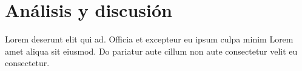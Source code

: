 \section{Análisis y discusión}
Lorem deserunt elit qui ad. Officia et excepteur eu ipsum culpa minim Lorem amet aliqua sit eiusmod. Do pariatur aute cillum non aute consectetur velit eu consectetur.